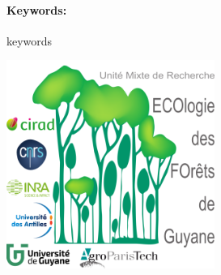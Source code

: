 \documentclass[12pt,]{article}
\theoremstyle{definition}
\theoremstyle{definition}
\theoremstyle{remark}
\begin{document}
  \paragraph{Keywords:} keywords
  
  \vspace*{\fill}
  \includegraphics{images/logo}
\end{document}
